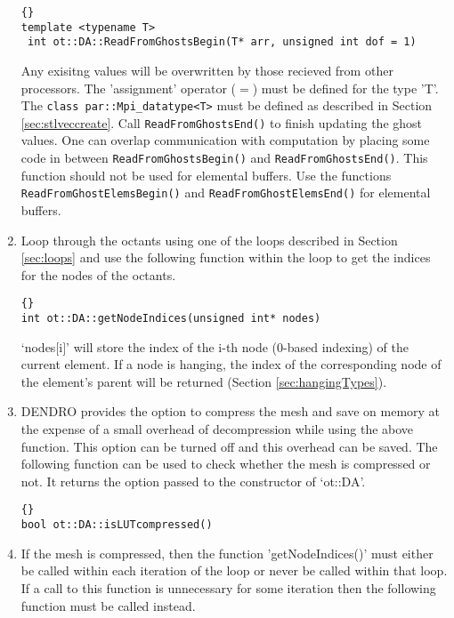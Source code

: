 \documentclass[12pt,reqno,a4paper]{report}
\numberwithin{equation}{section}
\begin{document}
\begin{enumerate}
\begin{lstlisting}[frame=trbl, fontadjust]{}
template <typename T>
 int ot::DA::ReadFromGhostsBegin(T* arr, unsigned int dof = 1)
\end{lstlisting}

Any exisitng values will be overwritten by those recieved from other processors. The 'assignment' operator ($=$) must be defined for the type 'T'.
The \lstinline[basicstyle=\bfseries]!class par::Mpi_datatype<T>! must be defined as described in Section \ref{sec:stlveccreate}. Call \lstinline[basicstyle=\bfseries]!ReadFromGhostsEnd()! to finish updating the ghost values. One can overlap communication with computation by placing
 some code in between \lstinline[basicstyle=\bfseries]!ReadFromGhostsBegin()! and \lstinline[basicstyle=\bfseries]!ReadFromGhostsEnd()!.
  This function should not be used for elemental buffers. Use the functions 
  \lstinline[basicstyle=\bfseries]!ReadFromGhostElemsBegin()! and \lstinline[basicstyle=\bfseries]!ReadFromGhostElemsEnd()! for elemental buffers.

\item Loop through the octants using one of the loops described in Section \ref{sec:loops} and use the following function within the
 loop to get the indices for the nodes of the octants.
 
\begin{lstlisting}[frame=trbl, fontadjust]{}
int ot::DA::getNodeIndices(unsigned int* nodes)
\end{lstlisting}

`nodes$[$i$]$' will store the index of the i-th node (0-based indexing) of the current element. If a node is hanging, the index of the
 corresponding node of the element's parent will be returned (Section \ref{sec:hangingTypes}).
 
\item DENDRO provides the option to compress the mesh and save on memory at the expense of a small overhead of decompression while using the above function. This option can be turned off and this overhead can be saved. The following function can be used to check whether the mesh is compressed or not. It returns the option passed to the constructor of `ot::DA'.

\begin{lstlisting}[frame=trbl, fontadjust]{}
bool ot::DA::isLUTcompressed()
\end{lstlisting}

\item If the mesh is compressed, then the function 'getNodeIndices()' must either be called within each iteration of the loop or never be called within that loop. If a call to this function is unnecessary for some iteration then the following function must be called instead.


\end{enumerate}
\end{document}
